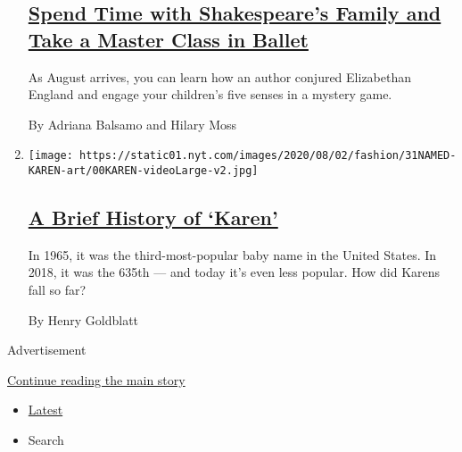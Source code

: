 \begin{enumerate}
{  \subsection{\texorpdfstring{\href{/2020/08/01/at-home/coronavirus-things-to-do-this-week.html}{Spend
  Time with Shakespeare's Family and Take a Master Class in
  Ballet}}{Spend Time with Shakespeare's Family and Take a Master Class in Ballet}}\label{spend-time-with-shakespeares-family-and-take-a-master-class-in-ballet}}

  As August arrives, you can learn how an author conjured Elizabethan
  England and engage your children's five senses in a mystery game.

  By Adriana Balsamo and Hilary Moss
\item
  \texttt{[image: https://static01.nyt.com/images/2020/08/02/fashion/31NAMED-KAREN-art/00KAREN-videoLarge-v2.jpg]}

  \hypertarget{a-brief-history-of-karen}{%
  \subsection{\texorpdfstring{\href{/2020/07/31/style/karen-name-meme-history.html}{A
  Brief History of
  `Karen'}}{A Brief History of `Karen'}}\label{a-brief-history-of-karen}}

  In 1965, it was the third-most-popular baby name in the United States.
  In 2018, it was the 635th --- and today it's even less popular. How
  did Karens fall so far?

  By Henry Goldblatt
\end{enumerate}

Advertisement

\protect\hyperlink{after-mid1}{Continue reading the main story}

\begin{itemize}
\tightlist
\item
  \protect\hyperlink{stream-panel}{Latest}
\item
  Search
\end{itemize}

